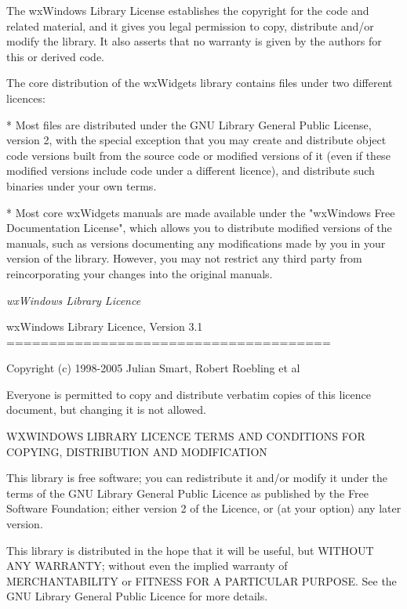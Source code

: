 The wxWindows Library License establishes the copyright for the code and
related material, and it gives you legal permission to copy, distribute and/or
modify the library. It also asserts that no warranty is given by the authors
for this or derived code.

The core distribution of the wxWidgets library contains files under two
different licences:

* Most files are distributed under the GNU Library General Public License,
version 2, with the special exception that you may create and distribute
object code versions built from the source code or modified versions of it
(even if these modified versions include code under a different licence),
and distribute such binaries under your own terms.

* Most core wxWidgets manuals are made available under the "wxWindows Free
Documentation License", which allows you to distribute modified versions of
the manuals, such as versions documenting any modifications made by you in
your version of the library. However, you may not restrict any third party
from reincorporating your changes into the original manuals.

\textit{wxWindows Library Licence}

\begin{center}
	wxWindows Library Licence, Version 3.1
	======================================
\end{center}

Copyright (c) 1998-2005 Julian Smart, Robert Roebling et al

Everyone is permitted to copy and distribute verbatim copies
of this licence document, but changing it is not allowed.

\begin{center}
	WXWINDOWS LIBRARY LICENCE
	TERMS AND CONDITIONS FOR COPYING, DISTRIBUTION AND MODIFICATION
\end{center}

This library is free software; you can redistribute it and/or modify it
under the terms of the GNU Library General Public Licence as published by
the Free Software Foundation; either version 2 of the Licence, or (at your
option) any later version.

This library is distributed in the hope that it will be useful, but WITHOUT
ANY WARRANTY; without even the implied warranty of MERCHANTABILITY or
FITNESS FOR A PARTICULAR PURPOSE.  See the GNU Library General Public
Licence for more details.

